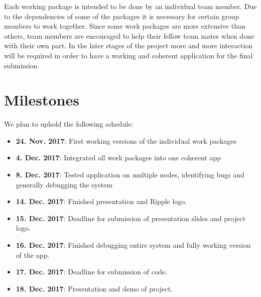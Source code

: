 \documentclass{report}
\begin{document}
Each working package is intended to be done by an individual team member. Due to the dependencies of some of the packages it is necessary for certain group members to work together. Since some work packages are more extensive than others, team members are encouraged to help their fellow team mates when done with their own part. In the later stages of the project more and more interaction will be required in order to have a working and coherent application for the final submission. 
 
\section{Milestones}

We plan to uphold the following schedule:
\begin{itemize}
\item  \textbf{24. Nov. 2017}: First working versions of the individual work packages
\item  \textbf{4. Dec. 2017}: Integrated all work packages into one coherent app
\item \textbf{8. Dec. 2017}: Tested application on multiple nodes, identifying bugs and generally debugging the system
\item \textbf{14. Dec. 2017}: Finished presentation and Ripple logo. 
\item \textbf{15. Dec. 2017}: Deadline for submission of presentation slides and project logo.
\item \textbf{16. Dec. 2017}: Finished debugging entire system and fully working version of the app.
\item \textbf{17. Dec. 2017}: Deadline for submission of code.
\item \textbf{18. Dec. 2017}: Presentation and demo of project.
\end{itemize}



\end{document}

